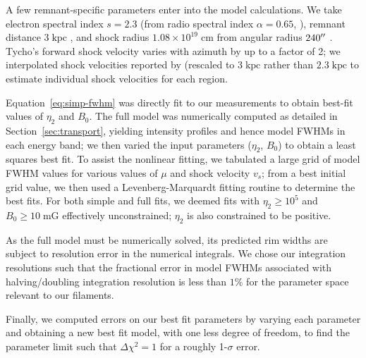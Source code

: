 \documentclass[iop, apj, numberedappendix, twocolappendix]{emulateapj}
\newcommand*{\mt}{\mathrm}
\newcommand*{\unit}[1]{\;\mt{#1}}  %
\begin{document}
A few remnant-specific parameters enter into the model calculations.  We take
electron spectral index $s = 2.3$ (from radio spectral index $\alpha = 0.65$,
\citet{kothes2006} ),
remnant distance $3 \unit{kpc}$ \citep[cf.][]{hayato2010}, and
shock radius $1.08 \times 10^{19} \unit{cm}$ from angular radius $240\mbox{$^{\prime\prime}$}$
\citep{green2009}.  Tycho's forward shock velocity varies with azimuth by up to
a factor of 2; we interpolated shock velocities reported by
\citet{williams2013} (rescaled to $3 \unit{kpc}$ rather than $2.3 \unit{kpc}$
to estimate individual shock velocities for each region.

Equation~\eqref{eq:simp-fwhm} was directly fit to our measurements to obtain
best-fit values of $\eta_2$ and $B_0$.
The full model was numerically computed as detailed in
Section~\ref{sec:transport}, yielding intensity profiles and hence model FWHMs
in each energy band; we then varied the input parameters ($\eta_2$, $B_0$) to
obtain a least squares best fit.
To assist the nonlinear fitting, we tabulated a large grid of model FWHM values
for various values of $\mu$ and shock velocity $v_s$; from a best initial grid
value, we then used a Levenberg-Marquardt fitting routine to determine the best
fits.
For both simple and full fits, we deemed fits with $\eta_2 \geq 10^5$ and $B_0
\geq 10 \unit{mG}$ effectively unconstrained; $\eta_2$ is also constrained to
be positive.

As the full model must be numerically solved, its predicted rim widths are
subject to resolution error in the numerical integrals.  We chose our
integration resolutions such that the fractional error in model FWHMs
associated with halving/doubling integration resolution is less than $1\%$ for
the parameter space relevant to our filaments.

Finally, we computed errors on our best fit parameters by varying each
parameter and obtaining a new best fit model, with one less degree of freedom,
to find the parameter limit such that $\Delta \chi^2 = 1$ for a roughly
1-$\sigma$ error.

\end{document}
